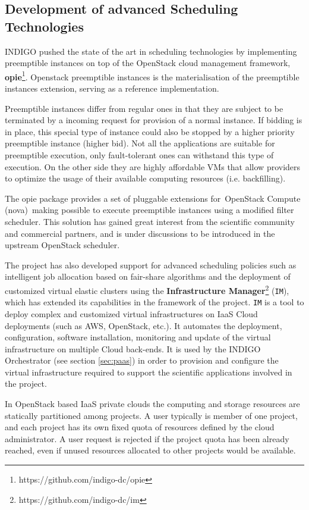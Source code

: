 \documentclass{article}
\begin{document}
\subsection{Development of advanced Scheduling Technologies}
\label{sec:sched}

INDIGO pushed the  state  of  the  art  in  scheduling  technologies  by  implementing  preemptible instances  on  top  of  the  OpenStack\cite{OPENSTACK}  cloud  management  framework, {\bf opie}\footnote{https://github.com/indigo-dc/opie}. Openstack preemptible instances is the materialisation of the preemptible instances extension, serving as a reference implementation.

Preemptible instances differ from regular ones in that they are subject to be terminated by a incoming request for provision of a normal instance. If bidding is in place, this special type of instance could also be stopped by a higher priority preemptible instance (higher bid). Not all the applications are suitable for preemptible execution, only fault-tolerant ones can withstand this type of execution. On the other side they are highly affordable VMs that allow providers to optimize the usage of their available computing resources (i.e. backfilling).

The opie package provides a set of pluggable extensions for OpenStack Compute (nova) making possible to execute preemptible instances using a modified filter scheduler. This solution has gained great interest from the scientific community and commercial partners, and is under discussions to  be  introduced  in  the  upstream  OpenStack  scheduler.  

The project has also developed support for advanced scheduling policies such as intelligent job allocation based on fair-share algorithms and the deployment  of customized  virtual elastic clusters using the {\bf Infrastructure Manager}\footnote{https://github.com/indigo-dc/im} ({\tt IM}), which has extended its capabilities in the framework of the project.  {\tt IM} is a tool to deploy complex and customized virtual infrastructures on IaaS Cloud deployments (such as AWS, OpenStack, etc.). It automates the deployment, configuration, software installation, monitoring and update of the virtual infrastructure on multiple Cloud back-ends. It is used by the INDIGO Orchestrator (see section \ref{sec:paas}) in order to provision and configure the virtual infrastructure required to support the scientific applications involved in the project.

In OpenStack based IaaS private clouds the computing and storage resources are statically partitioned among projects. A user typically is member of one project, and each project has its own fixed quota of resources defined by the cloud administrator. A user request is rejected if the project quota has been already reached, even if unused resources allocated to other projects would be available. 
\end{document}
